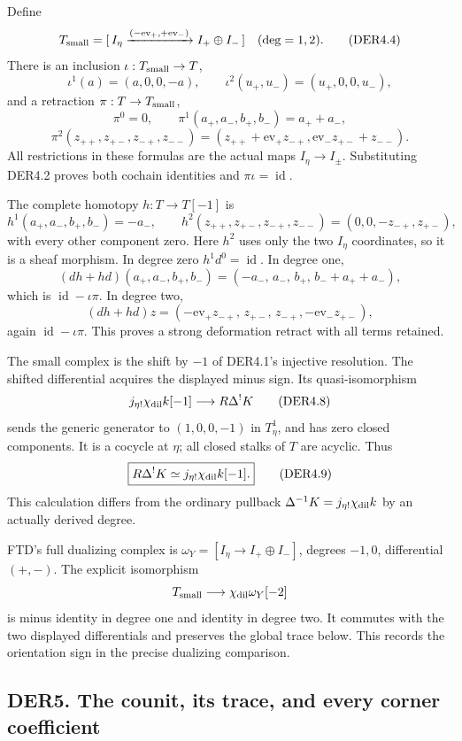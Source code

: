 Define \[
T_{\rm small}
=[\,I_\eta\xrightarrow{(-\mathrm{ev}_+,+\mathrm{ev}_-)}
      I_+\oplus I_-\,]\quad(\deg=1,2).
\tag{DER4.4}
\] There is an inclusion \(\iota:T_{\rm small}\to T\), \[
\iota^1(a)=(a,0,0,-a),\qquad
\iota^2(u_+,u_-)=(u_+,0,0,u_-),
\tag{DER4.5}
\] and a retraction \(\pi:T\to T_{\rm small}\), \[
\pi^0=0,\qquad
\pi^1(a_+,a_-,b_+,b_-)=a_++a_-,
\] \[
\pi^2(z_{++},z_{+-},z_{-+},z_{--})
=(z_{++}+\mathrm{ev}_+z_{-+},
  \mathrm{ev}_-z_{+-}+z_{--}).
\tag{DER4.6}
\] All restrictions in these formulas are the actual maps
\(I_\eta\to I_\pm\). Substituting DER4.2 proves both cochain identities
and \(\pi\iota=\operatorname{id}\).

The complete homotopy \(h:T\to T[-1]\) is \[
h^1(a_+,a_-,b_+,b_-)=-a_-,\qquad
h^2(z_{++},z_{+-},z_{-+},z_{--})=(0,0,-z_{-+},z_{+-}),
\tag{DER4.7}
\] with every other component zero. Here \(h^2\) uses only the two
\(I_\eta\) coordinates, so it is a sheaf morphism. In degree zero
\(h^1d^0=\operatorname{id}\). In degree one, \[
(dh+hd)(a_+,a_-,b_+,b_-)
=(-a_-,\,a_-,\,b_+,\,b_-+a_++a_-),
\] which is \(\operatorname{id}-\iota\pi\). In degree two, \[
(dh+hd)z=(-\mathrm{ev}_+z_{-+},\,z_{+-},\,z_{-+},
          -\mathrm{ev}_-z_{+-}),
\] again \(\operatorname{id}-\iota\pi\). This proves a strong
deformation retract with all terms retained.

The small complex is the shift by \(-1\) of DER4.1's injective
resolution. The shifted differential acquires the displayed minus sign.
Its quasi-isomorphism \[
j_{\eta!}\chi_{\rm dil}k[-1]\longrightarrow
R\Delta^!K
\tag{DER4.8}
\] sends the generic generator to \((1,0,0,-1)\) in \(T^1_\eta\), and
has zero closed components. It is a cocycle at \(\eta\); all closed
stalks of \(T\) are acyclic. Thus \[
\boxed{R\Delta^!K\simeq j_{\eta!}\chi_{\rm dil}k[-1].}
\tag{DER4.9}
\] This calculation differs from the ordinary pullback
\(\Delta^{-1}K=j_{\eta!}\chi_{\rm dil}k\) by an actually derived degree.

FTD's full dualizing complex is \(\omega_Y=[I_\eta\to I_+\oplus I_-]\),
degrees \(-1,0\), differential \((+,-)\). The explicit isomorphism \[
T_{\rm small}\longrightarrow\chi_{\rm dil}\omega_Y[-2]
\] is minus identity in degree one and identity in degree two. It
commutes with the two displayed differentials and preserves the global
trace below. This records the orientation sign in the precise dualizing
comparison.

\subsection{DER5. The counit, its trace, and every corner
coefficient}\label{der5.-the-counit-its-trace-and-every-corner-coefficient}

